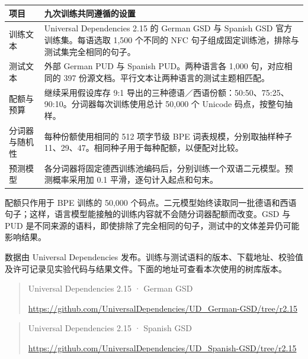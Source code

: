 \documentclass[11pt,a4paper]{article}
\newlength{\BpeDocTableWidth}
\begin{document}
\begingroup\fontsize{9.3}{12.7}\selectfont{}
\setlength{\BpeDocTableWidth}{\dimexpr\linewidth-4\tabcolsep\relax}
\renewcommand{\arraystretch}{1.15}
\par\addvspace{0.45em}
\noindent\begin{minipage}{\linewidth}
\begin{tabular}{>{\raggedright\arraybackslash}p{0.210000\BpeDocTableWidth}>{\raggedright\arraybackslash}p{0.790000\BpeDocTableWidth}}
\toprule
\textbf{项目} & \textbf{九次训练共同遵循的设置} \\

\midrule
训练文本 & Universal Dependencies 2.15 的 German GSD 与 Spanish GSD 官方训练集。每语选取 1,500 个不同的 NFC 句子组成固定训练池，排除与测试集完全相同的句子。 \\[3pt]
测试文本 & 外部 German PUD 与 Spanish PUD。两种语言各 1,000 句，对应相同的 397 份源文档。平行文本让两种语言的测试主题相匹配。 \\[3pt]
配额与预算 & 继续采用假设库存 9:1 导出的三种德语／西语份额：50:50、75:25、90:10。分词器每次训练使用总计 50,000 个 Unicode 码点，按整句抽样。 \\[3pt]
分词器与随机性 & 每种份额使用相同的 512 项字节级 BPE 词表规模，分别取抽样种子 11、29、47。相同种子用于每种配额，以便配对比较。 \\[3pt]
预测模型 & 各分词器将固定德西训练池编码后，分别训练一个双语二元模型。预测概率采用加 0.1 平滑，逐句计入起点和句末。 \\[3pt]
\bottomrule
\end{tabular}
\end{minipage}\par\addvspace{0.65em}
\endgroup


配额只作用于 BPE 训练的 50,000 个码点。二元模型始终读取同一批德语和西语句子；这样，语言模型能接触的训练内容就不会随分词器配额而改变。GSD 与 PUD 是不同来源的语料，即使排除了完全相同的句子，测试中的文体差异仍可能影响结果。


数据由 Universal Dependencies 发布。训练与测试语料的版本、下载地址、校验值及许可记录见实验代码与结果文件。下面的地址可查看本次使用的树库版本。


\begin{quote}\footnotesize\setlength{\parskip}{0pt} Universal Dependencies 2.15 · German GSD
\par\nobreak
\url{https://github.com/UniversalDependencies/UD_German-GSD/tree/r2.15}
\end{quote}


\begin{quote}\footnotesize\setlength{\parskip}{0pt} Universal Dependencies 2.15 · Spanish GSD
\par\nobreak
\url{https://github.com/UniversalDependencies/UD_Spanish-GSD/tree/r2.15}
\end{quote}
\end{document}
